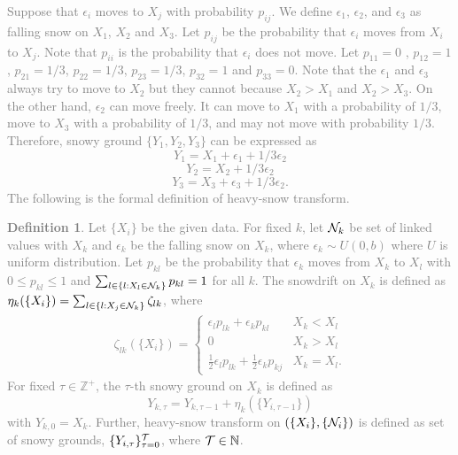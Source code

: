 \documentclass[preprint, review, 12pt]{article}
\theoremstyle{definition}
\newtheorem{dfn}{Definition}
\theoremstyle{remark}
\begin{document}
\textcolor{gray}{Suppose that $\epsilon_i$ moves to $X_j$ with probability $p_{ij}$. We define $\epsilon_1$, $\epsilon_2$, and $\epsilon_3$ as falling snow on $X_1$, $X_2$ and $X_3$. Let $p_{ij}$ be the probability that $\epsilon_i$ moves from $X_i$ to $X_j$. Note that $p_{ii}$ is the probability that $\epsilon_i$ does not move. Let $p_{11}=0$ , $p_{12}=1$, $p_{21}=1/3$, $p_{22}=1/3$, $p_{23}=1/3$, $p_{32}=1$ and $p_{33}=0$. Note that the $\epsilon_1$ and $\epsilon_3$ always try to move to $X_2$ but they cannot because $X_2>X_1$ and $X_2>X_3$. On the other hand, $\epsilon_2$ can move freely. It can move to $X_1$ with a probability of $1/3$, move to $X_3$ with a probability of $1/3$, and may not move with probability $1/3$. Therefore, snowy ground $\{Y_1,Y_2,Y_3\}$ can be expressed as
\[
Y_1=X_1+\epsilon_1+1/3\epsilon_2
\]
\[
Y_2=X_2+1/3\epsilon_2
\]
\[
Y_3=X_3+\epsilon_3+1/3\epsilon_2.
\]
The following is the formal definition of heavy-snow transform.
\begin{dfn}\label{snow:df_hst}
Let $\{X_i\}$ be the given data. For fixed $k$, let ${\cal N}_{k}$ be set of linked values with $X_k$ and $\epsilon_k$ be the falling snow on $X_k$, where $\epsilon_k \sim U(0,b)$ where $U$ is uniform distribution. Let $p_{kl}$ be the probability that $\epsilon_k$ moves from $X_k$ to $X_l$ with $0\leq p_{kl}\leq 1$ and $\sum_{l\in\{l:X_l\in{\cal N}_k\}}p_{kl}=1$ for all $k$. The snowdrift on $X_k$ is defined as $\eta_k(\{X_i\})=\sum_{l\in\{l:X_j\in{\cal N}_k\}}\zeta_{lk}$, where 
	\begin{align*}
	\zeta_{lk}(\{X_i\})=\begin{cases}
	\epsilon_{l}p_{lk}+\epsilon_kp_{kl} & X_k<X_l \\ 
	0 & X_k>X_l \\
	\frac{1}{2}\epsilon_{l}p_{lk}+\frac{1}{2}\epsilon_kp_{kj} &X_k=X_l.
	\end{cases}
	\end{align*} 
	For fixed $\tau \in \mathbb{Z}^+$, the $\tau$-th snowy ground on $X_k$ is defined as 
	\[
	Y_{k,\tau}=Y_{k,\tau-1}+\eta_k(\{Y_{i,\tau-1}\})
	\]
	with $Y_{k,0}=X_k$. Further, heavy-snow transform on $(\{X_i\},\{{\cal N}_i\})$ is defined as set of snowy grounds, $\{Y_{i,\tau}\}_{\tau=0}^{\cal T}$, where ${\cal T}\in\mathbb{N}$.
\end{dfn}
}
\end{document}
